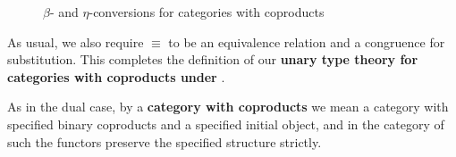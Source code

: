 \begin{figure}
  \centering
  \caption{$\beta$- and $\eta$-conversions for categories with coproducts}
  \label{fig:catcoprod-equiv}
\end{figure}
As usual, we also require $\equiv$ to be an equivalence relation and a congruence for substitution.
This completes the definition of our \textbf{unary type theory for categories with coproducts under \cG}.


As in the dual case, by a \textbf{category with coproducts} we mean a category with specified binary coproducts and a specified initial object, and in the category of such the functors preserve the specified structure strictly.

